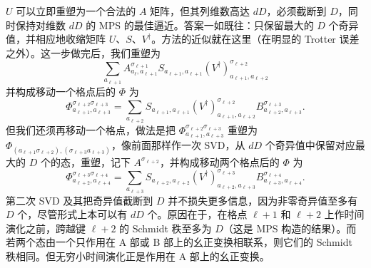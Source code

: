 $U$ 可以立即重塑为一个合法的 $A$ 矩阵，但其列维数高达 $dD$，必须截断到 $D$，同时保持对维数 $dD$ 的 MPS 的最佳逼近。答案一如既往：只保留最大的 $D$ 个奇异值，并相应地收缩矩阵 $U$、$S$、$V^\dagger$。方法的近似就在这里（在明显的 Trotter 误差之外）。这一步做完后，我们重塑为
\begin{equation}
\sum_{a_{\ell+1}} A^{\sigma_{\ell+1}}_{a_\ell, a_{\ell+1}}  S_{a_{\ell+1},a_{\ell+1}} (V^\dagger)^{\sigma_{\ell+2}}_{a_{\ell+1},  a_{\ell+2}}
\end{equation}
并构成移动一个格点后的 $\Phi$ 为
\begin{equation}
\Phi^{\sigma_{\ell+2}\sigma_{\ell+3}}_{a_{\ell+1},a_{\ell+3}} = \sum_{a_{\ell+2}} S_{a_{\ell+1},a_{\ell+1}} (V^\dagger)^{\sigma_{\ell+2}}_{a_{\ell+1},  a_{\ell+2}} B^{\sigma_{\ell+3}}_{a_{\ell+2},  a_{\ell+3}} .
\end{equation}
但我们还须再移动一个格点，做法是把 $\Phi^{\sigma_{\ell+2}\sigma_{\ell+3}}_{a_{\ell+1},a_{\ell+3}}$ 重塑为 $\Phi_{(a_{\ell+1}\sigma_{\ell+2}),(\sigma_{\ell+3} a_{\ell+3})}$，像前面那样作一次 SVD，从 $dD$ 个奇异值中保留对应最大的 $D$ 个的态，重塑，记下 $A^{\sigma_{\ell+2}}$，并构成移动两个格点后的 $\Phi$ 为
\begin{equation}
\Phi^{\sigma_{\ell+3}\sigma_{\ell+4}}_{a_{\ell+2},a_{\ell+4}} = \sum_{a_{\ell+3}} S_{a_{\ell+2},a_{\ell+2}} (V^\dagger)^{\sigma_{\ell+3}}_{a_{\ell+2},  a_{\ell+3}} B^{\sigma_{\ell+4}}_{a_{\ell+3},  a_{\ell+4}} .
\end{equation}
第二次 SVD 及其把奇异值截断到 $D$ 并不损失更多信息，因为非零奇异值至多有 $D$ 个，尽管形式上本可以有 $dD$ 个。原因在于，在格点 $\ell+1$ 和 $\ell+2$ 上作时间演化之前，跨越键 $\ell+2$ 的 Schmidt 秩至多为 $D$（这是 MPS 构造的结果）。而若两个态由一个只作用在 A 部或 B 部上的幺正变换相联系，则它们的 Schmidt 秩相同。但无穷小时间演化正是作用在 A 部上的幺正变换。

